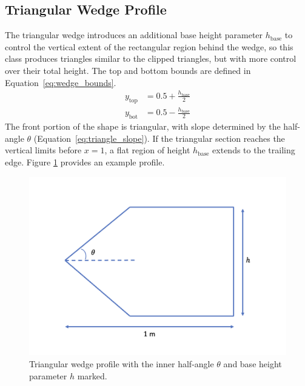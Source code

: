 \documentclass[11pt]{article}
\begin{document}
\subsection{Triangular Wedge Profile}
The triangular wedge introduces an additional base height parameter $h_{\text{base}}$ to control the vertical extent of the rectangular region behind the wedge, so this class produces triangles similar to the clipped triangles, but with more control over their total height. The top and bottom bounds are defined in Equation~\ref{eq:wedge_bounds}.
\begin{subequations} \label{eq:wedge_bounds}
\begin{align}
y_{\text{top}} &= 0.5 + \frac{h_{\text{base}}}{2} \label{eq:wedge_top}\\
y_{\text{bot}} &= 0.5 - \frac{h_{\text{base}}}{2} \label{eq:wedge_bot}
\end{align}
\end{subequations}
The front portion of the shape is triangular, with slope determined by the half-angle $\theta$ (Equation~\ref{eq:triangle_slope}). If the triangular section reaches the vertical limits before $x=1$, a flat region of height $h_{\text{base}}$ extends to the trailing edge. Figure \ref{fig:wedge} provides an example profile.
\begin{figure}[H]
\centering
    \includegraphics[width=0.5\linewidth]{wedge.png}
    \caption{Triangular wedge profile with the inner half-angle $\theta$ and base height parameter $h$ marked.}
\label{fig:wedge}
\end{figure}
\end{document}
